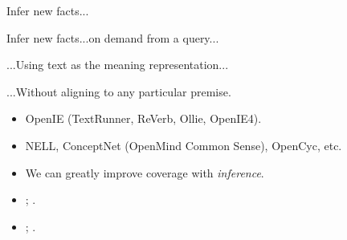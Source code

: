\documentclass[hyperref]{beamer}
\begin{document}
\begin{frame}[noframenumbering]{Infer new facts...}
\begin{center}
  \teaserBlindInferenceNaturalOrder
\end{center}
\end{frame}

\begin{frame}[noframenumbering]{Infer new facts...on demand from a query...}
\begin{center}
  \teaserBlindInference
\end{center}
\end{frame}

\begin{frame}[noframenumbering]{...Using text as the meaning representation...}
\begin{center}
  \teaserInference
\end{center}
\end{frame}

\begin{frame}[noframenumbering]{...Without aligning to any particular premise.}
\begin{center}
  \teaserFullDerivation
\end{center}
\end{frame}


\begin{frame}{}
\begin{center}
  \teaserBlindInferenceNaturalOrder
\end{center}
\end{frame}

\begin{frame}[noframenumbering]{}
\begin{itemize}
  \item OpenIE (TextRunner, ReVerb, Ollie, OpenIE4).
  \item NELL, ConceptNet (OpenMind Common Sense), OpenCyc, etc.
\end{itemize}
\vspace{0.5cm}
\pause

\pause
\begin{itemize}
  \item We can greatly improve coverage with \textit{inference}.
\end{itemize}
\vspace{0.5cm}
\pause

\begin{itemize}
  \item {}; .
\end{itemize}
\pause

\begin{itemize}
  \item {}; .
\end{itemize}
\end{frame}
\end{document}
